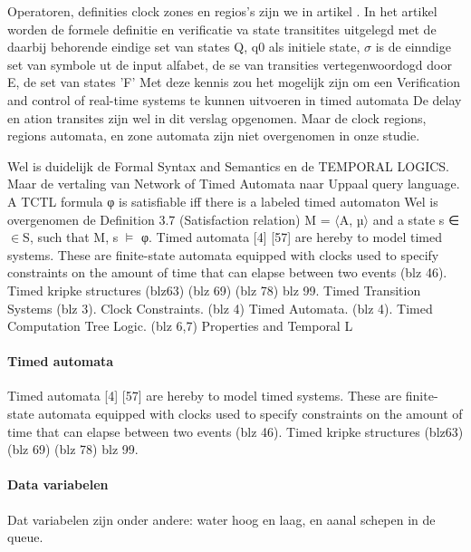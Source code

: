  Operatoren, definities clock zones en regios's zijn we in artikel . \cite{04_giWorkshop2000}
 \cite{pelanekFormal} 
 In het artikel worden de formele definitie en verificatie va   state transitites uitgelegd met de daarbij behorende eindige set van states Q, q0 als initiele state, $\sigma$ is de einndige set van symbole ut de input alfabet, de se van transities vertegenwoordogd door E, de set van states 'F'
 \cite{jiyanpatil07TOC}
 Met deze kennis zou het mogelijk zijn om een Verification and control of real-time systems te kunnen uitvoeren in timed automata
 \cite{latin06}
 \cite{realtimeForms}
 \cite{verification}
 \cite{uppaal}
 De delay en ation transites zijn wel in dit verslag opgenomen. Maar de clock regions, regions automata, en zone automata zijn niet overgenomen in onze studie.

 

 \cite{03CHAPTER3}
 Wel is duidelijk de Formal Syntax and Semantics en de TEMPORAL LOGICS. Maar de vertaling van 
 Network of Timed Automata naar Uppaal query language. A TCTL formula φ is satisfiable iff there is a labeled timed automaton
 Wel is overgenomen de Definition 3.7 (Satisfaction relation) 
 M = $\langle$A, µ$\rangle$ and a state s ∈$\in$S, such that M, s $\models$ φ.
 \cite{isbn9789526031033}
 Timed automata [4] [57] are hereby to model timed systems. These are finite-state automata
 equipped with clocks used to specify constraints on the amount of time that can elapse
 between two events (blz 46). Timed kripke structures (blz63) (blz 69) (blz 78) blz 99.
 \cite{nourollahi20191215}
 \cite{Lecture2}
 Timed Transition Systems (blz 3). Clock Constraints. (blz 4) Timed Automata.  (blz 4). Timed Computation Tree Logic.  (blz 6,7)
 \cite{LIPIcs-TIME-2021-12}
 Properties and Temporal L
 \cite{mctutorial}
 \cite{FULLTEXT02}
 \cite{stanfordRealtime}
 \cite{baierKatoenModelChecking}
 
 
 \paragraph{Timed automata}
  Timed automata [4] [57] are hereby to model timed systems. These are finite-state automata
 equipped with clocks used to specify constraints on the amount of time that can elapse
 between two events (blz 46). Timed kripke structures (blz63) (blz 69) (blz 78) blz 99.
 \cite{nourollahi20191215}
 
\paragraph{Data variabelen}
Dat variabelen zijn onder andere: water hoog  en laag, en aanal schepen in de queue.
